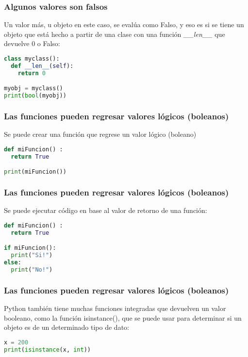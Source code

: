 \begin{frame}[fragile]
  \frametitle{Algunos valores son falsos}

  Un valor más, u objeto en este caso, se evalúa como Falso, y eso es si
  se tiene un objeto que está hecho a partir de una clase con una función
  \emph{\_\_len\_\_} que devuelve 0 o Falso: 

  \vspace{\baselineskip}
  \begin{lstlisting}[language=Python]
class myclass():
  def __len__(self):
    return 0

myobj = myclass()
print(bool(myobj))
  \end{lstlisting}
\end{frame}

\begin{frame}[fragile]
  \frametitle{Las funciones pueden regresar valores lógicos (boleanos)}

  Se puede crear una función que regrese un valor lógico (boleano)

  \vspace{\baselineskip}
  \begin{lstlisting}[language=Python]
def miFuncion() :
  return True

print(miFuncion())
  \end{lstlisting}
\end{frame}

\begin{frame}[fragile]
  \frametitle{Las funciones pueden regresar valores lógicos (boleanos)}

  Se puede ejecutar código en base al valor de retorno de una función:

  \vspace{\baselineskip}
  \begin{lstlisting}[language=Python]
def miFuncion() :
  return True

if miFuncion():
  print("Si!")
else:
  print("No!") 
  \end{lstlisting}
\end{frame}

\begin{frame}[fragile]
  \frametitle{Las funciones pueden regresar valores lógicos (boleanos)}

  Python también tiene muchas funciones integradas que devuelven un valor
  booleano, como la función \textcolor{codeKeyword2}{isinstance}(),
  que se puede usar para determinar si un objeto es de un determinado
  tipo de dato: 

  \vspace{\baselineskip}
  \begin{lstlisting}[language=Python]
x = 200
print(isinstance(x, int)) 
  \end{lstlisting}
\end{frame}
